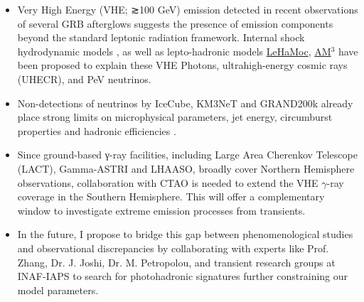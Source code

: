\begin{itemize}
    \itemsep0em 
    \item Very High Energy (VHE; ≳100 GeV) emission detected in recent observations of several GRB afterglows suggests the presence of emission components beyond the standard leptonic radiation framework. Internal shock hydrodynamic models \cite{Waxman_1995} \cite{Waxman_1997}, as well as lepto-hadronic models \cite{Asano_2012}  \href{https://github.com/mariapetro/LeHaMoC}{LeHaMoc}, \href{
https://am3.readthedocs.io/en/latest/}{AM$^{3}$} have been proposed to explain these VHE Photons, ultrahigh-energy cosmic rays (UHECR), and PeV neutrinos.

    \item Non-detections of neutrinos by IceCube, KM3NeT and GRAND200k already place strong limits on microphysical parameters, jet energy, circumburst properties and hadronic efficiencies \cite{mondal2025multimessengerstudygrb}. 
    \item Since ground-based γ-ray facilities, including Large Area Cherenkov Telescope (LACT), Gamma-ASTRI and LHAASO, broadly cover Northern Hemisphere observations, collaboration with CTAO is needed to extend the VHE $\gamma$-ray coverage in the Southern Hemisphere. This will offer a complementary window to investigate extreme emission processes from transients.
    
    \item In the future, I propose to bridge this gap between phenomenological studies and observational discrepancies by collaborating with experts like Prof. Zhang, Dr. J. Joshi, Dr. M. Petropolou, and transient research groups at INAF-IAPS to search for photohadronic signatures further constraining our model parameters. 
\end{itemize}

\subsection*{\fontsize{12 pt}{10 pt}\selectfont{Pillar 3: Computation and Instrumentation :}}

\subsubsection*{\fontsize{11.5 pt}{10 pt}\selectfont{Machine Learning Techniques : }}


